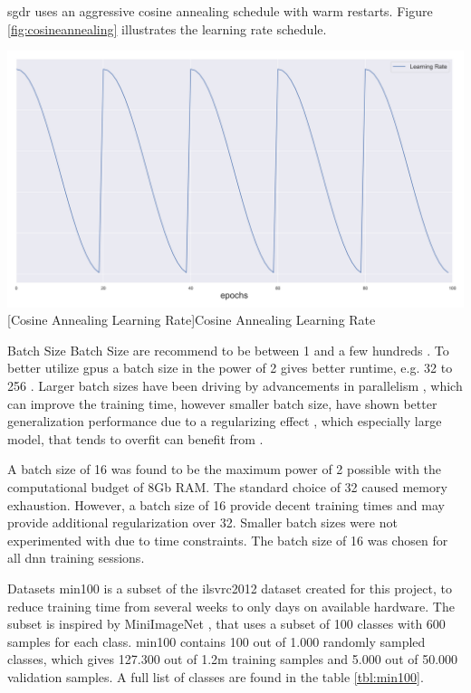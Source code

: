 \begin{enumdescript}
\begin{enumdescript}
		\gls{sgdr} uses an aggressive cosine annealing schedule with warm restarts. Figure \ref{fig:cosineannealing} illustrates the learning rate schedule.
		
		\begin{minipage}[t]{\linewidth}
			\centering
			\includegraphics[width=.7\linewidth]{figures/lr.png}
			[Cosine Annealing Learning Rate]{Cosine Annealing Learning Rate} 
			\label{fig:cosineannealing}
		\end{minipage}
		
		\item[Batch Size] Batch Size are recommend to be between 1 and a few hundreds \cite{bengio_practical_2012}. To better utilize \gls{gpu}s a batch size in the power of 2 gives better runtime, e.g. 32 to 256 \cite{goodfellow_deep_2016}. Larger batch sizes have been driving by advancements in parallelism \cite{dean_large_2012}, which can improve the training time, however smaller batch size, have shown better generalization performance due to a regularizing effect \cite{masters_revisiting_nodate}, which especially large model, that tends to overfit can benefit from \cite{goodfellow_deep_2016}. 
		
		A batch size of 16 was found to be the maximum power of 2 possible with the computational budget of 8Gb RAM. The standard choice of 32 caused memory exhaustion. However, a batch size of 16 provide decent training times and may provide additional regularization over 32. Smaller batch sizes were not experimented with due to time constraints. The batch size of 16 was chosen for all \gls{dnn} training sessions.
		
		\item[Datasets] \gls{min100} is a subset of the \gls{ilsvrc2012} dataset \cite{russakovsky_imagenet_2015} created for this project, to reduce training time from several weeks to only days on available hardware. The subset is inspired by MiniImageNet \cite{vinyals_matching_2016}, that uses a subset of 100 classes with 600 samples for each class. \gls{min100} contains 100 out of 1.000 randomly sampled classes, which gives 127.300 out of 1.2m training samples and 5.000 out of 50.000 validation samples. A full list of classes are found in the table \ref{tbl:min100}. 
		

\end{enumdescript}
\end{enumdescript}
